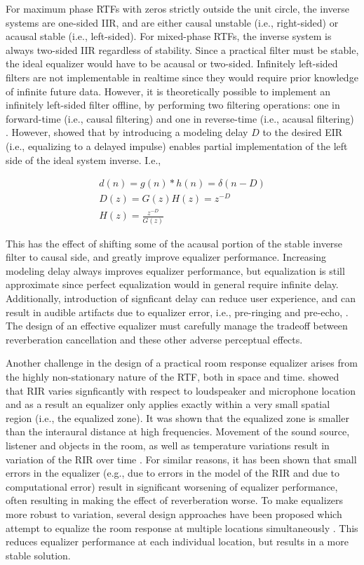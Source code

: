  For maximum phase RTFs with zeros strictly outside the unit circle, the inverse systems are one-sided IIR, and are either causal unstable (i.e., right-sided) or acausal stable (i.e., left-sided). For mixed-phase RTFs, the inverse system is always two-sided IIR regardless of stability. Since a practical filter must be stable, the ideal equalizer would have to be acausal or two-sided. Infinitely left-sided filters are not implementable in realtime since they would require prior knowledge of infinite future data. However, it is theoretically possible to implement an infinitely left-sided filter offline, by performing two filtering operations: one in forward-time (i.e., causal filtering) and one in reverse-time (i.e., acausal filtering) \citep{kormylo1974twopass}. However, \cite{treitel1966design} showed that by introducing a modeling delay $D$ to the desired EIR (i.e., equalizing to a delayed impulse) enables partial implementation of the left side of the ideal system inverse. I.e., 

\begin{eqnarray}
	d(n)=g(n)*h(n)=\delta(n-D) \\
	D(z)=G(z)H(z)=z^{-D}	\\
	H(z)=\frac{z^{-D}}{G(z)}
\end{eqnarray}

This has the effect of shifting some of the acausal portion of the stable inverse filter to causal side, and greatly improve equalizer performance. Increasing modeling delay always improves equalizer performance, but equalization is still approximate since perfect equalization would in general require infinite delay. Additionally, introduction of signficant delay can reduce user experience, and can result in audible artifacts due to equalizer error, i.e., pre-ringing and pre-echo, \citep{brannmark2009spatially}. The design of an effective equalizer must carefully manage the tradeoff between reverberation cancellation and these other adverse perceptual effects.

Another challenge in the design of a practical room response equalizer arises from the highly non-stationary nature of the RTF, both in space and time. \cite{mourjopoulos1985variation} showed that RIR varies signficantly with respect to loudspeaker and microphone location and as a result an equalizer only applies exactly within a very small spatial region (i.e., the equalized zone). It was shown that the equalized zone is smaller than the interaural distance at high frequencies. Movement of the sound source, listener and objects in the room, as well as temperature variations result in variation of the RIR over time \citep{omura1999compensating}. For similar reasons, it has been shown that small errors in the equalizer (e.g., due to errors in the model of the RIR and due to computational error) result in significant worsening of equalizer performance, often resulting in making the effect of reverberation worse. To make equalizers more robust to variation, several design approaches have been proposed which attempt to equalize the room response at multiple locations simultaneously \citep{elliott1989multiple, haneda1997multiple}. This reduces equalizer performance at each individual location, but results in a more stable solution.

